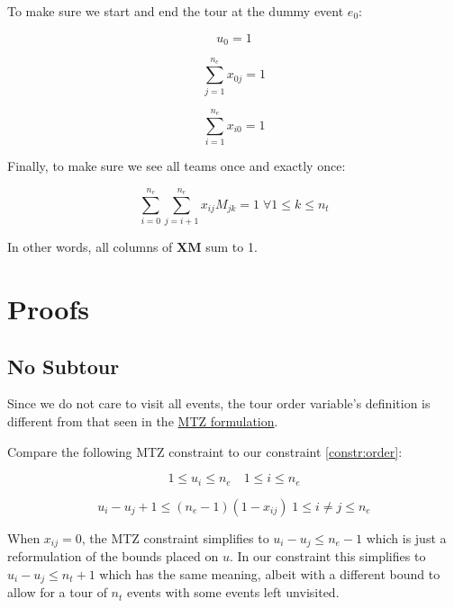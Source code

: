 \documentclass[11pt]{article}
\begin{document}
To make sure we start and end the tour at the dummy event $e_0$:

\begin{equation} \label{constr:start}
    u_0 = 1
\end{equation}

\begin{equation} \label{constr:start_out_edge}
    \sum_{j=1}^{n_e} x_{0j} = 1
\end{equation}

\begin{equation} \label{constr:end}
    \sum_{i=1}^{n_e} x_{i0} = 1
\end{equation}

Finally, to make sure we see all teams once and exactly once:

\begin{equation} \label{constr:teams}
    \sum_{i=0}^{n_e} \sum_{j=i + 1}^{n_e} x_{ij}M_{jk}  = 1 \; \forall 1 \leq k \leq n_t
\end{equation}

In other words, all columns of $\mathbf{X} \mathbf{M}$ sum to 1.

\section{Proofs}
\subsection{No Subtour}
Since we do not care to visit all events, the tour order variable's definition is different from that seen in the \href{https://en.wikipedia.org/wiki/Travelling_salesman_problem#Miller%E2%80%93Tucker%E2%80%93Zemlin_formulation}{MTZ formulation}.

Compare the following MTZ constraint to our constraint \eqref{constr:order}:

\begin{equation} \label{constr:mtz_u}
    1 \leq u_i \leq n_e \quad 1 \leq i \leq n_e
\end{equation}

\begin{equation} \label{constr:mtz}
    u_i - u_j + 1 \leq (n_e - 1)(1 - x_{ij}) \; 1 \leq i \neq j \leq n_e
\end{equation}

When $x_{ij} = 0$, the MTZ constraint simplifies to $u_i - u_j \leq n_e - 1$ which is just a reformulation of the bounds placed on $u$. In our constraint this simplifies to $u_i - u_j \leq n_t + 1$ which has the same meaning, albeit with a different bound to allow for a tour of $n_t$ events with some events left unvisited.
\end{document}
